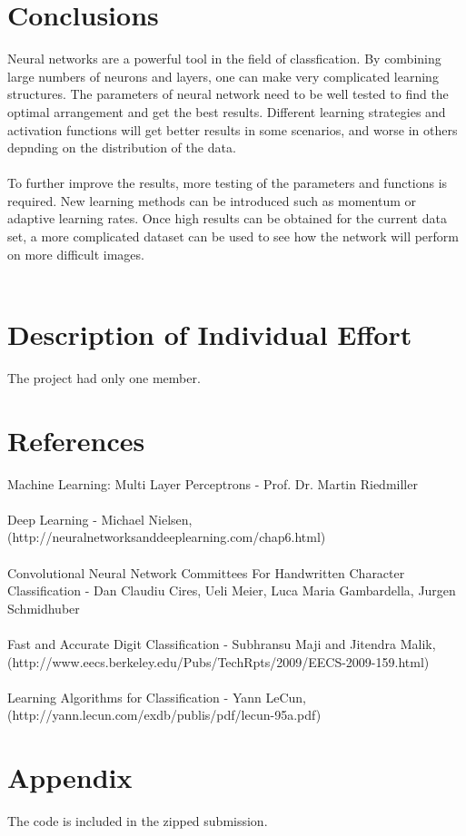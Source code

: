 \documentclass[paper=a4, fontsize=11pt]{scrartcl} %
\numberwithin{equation}{section} %
\numberwithin{figure}{section} %
\numberwithin{table}{section} %
\begin{document}
	\section{Conclusions}
	Neural networks are a powerful tool in the field of classfication. By combining large numbers of neurons and layers, one can make very complicated learning structures. The parameters of neural network need to be well tested to find the optimal arrangement and get the best results. Different learning strategies and activation functions will get better results in some scenarios, and worse in others depnding on the distribution of the data.
	\\\\
	To further improve the results, more testing of the parameters and functions is required. New learning methods can be introduced such as momentum or adaptive learning rates. Once high results can be obtained for the current data set, a more complicated dataset can be used to see how the network will perform on more difficult images. 
	\\\\
	\newpage
	\section{Description of Individual Effort}
	The project had only one member.
	\newpage
	\section{References}
	Machine Learning: Multi Layer Perceptrons - Prof. Dr. Martin Riedmiller
	\\\\
	Deep Learning - Michael Nielsen, (http://neuralnetworksanddeeplearning.com/chap6.html)
	\\\\
	Convolutional Neural Network Committees For Handwritten Character Classification - Dan Claudiu Cires, Ueli Meier, Luca Maria Gambardella, Jurgen Schmidhuber
	\\\\
	Fast and Accurate Digit Classification - Subhransu Maji and Jitendra Malik, (http://www.eecs.berkeley.edu/Pubs/TechRpts/2009/EECS-2009-159.html)
	\\\\
	Learning Algorithms for Classification - Yann LeCun, (http://yann.lecun.com/exdb/publis/pdf/lecun-95a.pdf)
	\newpage
	\section{Appendix}
	The code is included in the zipped submission.
	
	
\end{document}

